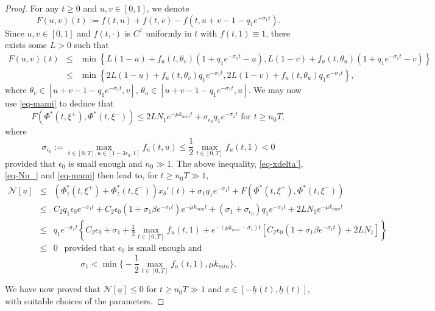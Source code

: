 \documentclass[11pt]{amsart}
\numberwithin{equation}{section}
\begin{document}
\begin{proof}
For any $t\geq 0$ and $u,v\in[0,1]$, we denote
\begin{equation*}
  F(u,v)(t):=f(t,u)+f(t,v)-f\left(t, u+v-1-q_1e^{-\sigma_1 t}\right).
\end{equation*}
Since $u, v\in [0,1]$ and $f(t,\cdot)$ is $C^1$  uniformly in $t$ with $f(t,1)\equiv 1$, there exists some $L>0$ such that
\begin{eqnarray*}
  F(u,v)(t)&\leq& \min\left\{L(1-u)+f_u(t,\theta_v)(1+ q_1e^{-\sigma_1t}-u), L(1-v)+f_u(t,\theta_u)(1+ q_1e^{-\sigma_1t}-v)\right\}\\
  &\leq& \min\left\{2L(1-u)+f_u(t,\theta_v) q_1e^{-\sigma_1t}, 2L(1-v)+f_u(t,\theta_u) q_1e^{-\sigma_1t}\right\},
\end{eqnarray*}
where $\theta_v\in [u+v-1-q_1e^{-\sigma_1 t}, v]$, $\theta_u\in [u+v-1-q_1e^{-\sigma_1 t}, u]$.
We may now use \eqref{eq-mami} to deduce that
\begin{equation*}
  F(\Phi^*(t,\xi^+),\Phi^*(t,\xi^-))\leq 2LN_1 e^{-\mu  k_{min}t}+\sigma_{\epsilon_0}q_1e^{-\sigma_1t} \mbox{ for } t\geq n_0T,
\end{equation*}
where
\[
\sigma_{\epsilon_0}:= \max_{t\in [0,T], u\in [1-3\epsilon_0, 1]}f_u(t,u)\leq \frac{1}{2}\max_{t\in [0,T]}f_u(t,1)<0 
\]
 provided that $\epsilon_0$ is small enough and $n_0\gg 1$.
The above inequality,  \eqref{eq-xdelta'}, \eqref{eq-Nu_}  and \eqref{eq-mami} then lead to,  for $t\geq  n_0T\gg1$,
 \begin{eqnarray*}
\mathcal{N}[\underline{u}]&\leq & (\Phi^*_z(t,\xi^+)+\Phi^*_z(t,\xi^-))x_\delta'(t)+\sigma_1q_1 e^{-\sigma_1t}+F(\Phi^*(t,\xi^+),\Phi^*(t,\xi^-))\\
&\leq &C_2q_1\epsilon_0e^{-\sigma_1t}+C_2\epsilon_0(1+\sigma_1\beta  e^{-\sigma_1t})e^{-\mu  k_{min}t}+(\sigma_1+\sigma_{\epsilon_0})q_1 e^{-\sigma_1t}+2LN_1 e^{-\mu  k_{min}t}\\
&\leq&q_1e^{-\sigma_1t}\left\{C_2\epsilon_0+\sigma_1+\frac{1}{2}\max_{t\in [0,T]}f_u(t,1)
+e^{-(\mu  k_{min}-\sigma_1)t}\left[C_2\epsilon_0(1+\sigma_1\beta e^{-\sigma_1t})+2LN_1\right]\right\}\\
&\leq& 0 \ \  \mbox{ provided that $\epsilon_0$ is small enough and}
\end{eqnarray*}
  \[
  \displaystyle\sigma_1<\min\Big\{-\frac12 \max_{t\in[0,T]}f_u(t,1),\mu k_{min}\Big\}.
  \]
 
 
 We have now proved that $\mathcal{N}[\underline{u}]\leq 0$ for $t\geq n_0T\gg1$ and $x\in [-\underline h(t), \underline h(t)]$, with suitable choices of the parameters.
\smallskip


\end{proof}
\end{document}
